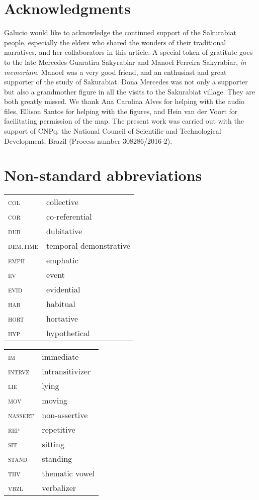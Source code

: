 \documentclass[output=paper,
modfonts,nonflat
]{langsci/langscibook}
\begin{document}
\newpage 
\section*{Acknowledgments}
Galucio would like to acknowledge the continued support of the Sakurabiat people, especially the elders who shared the wonders of their traditional narratives, and her collaborators in this article. A special token of gratitute goes to the late Mercedes Guaratira Sakyrabiar and Manoel Ferreira Sakyrabiar, \textit{in memoriam}. Manoel was a very good friend, and an enthusiast and great supporter of the study of Sakurabiat. Dona Mercedes was not only a supporter but also a grandmother figure in all the visits to the Sakurabiat village. They are both greatly missed. We thank Ana Carolina Alves for helping with the audio files, Ellison Santos for helping with the figures, and Hein van der Voort for facilitating permission of the map.
The present work was carried out with the support of CNPq, the National Council of Scientific and Technological Development, Brazil (Process number 308286/2016-2).

\section*{Non-standard abbreviations}

\begin{tabularx}{.5\textwidth}{lQ}
\textsc{col } & collective \\
\textsc{cor } & co-referential \\
\textsc{dub } & dubitative \\
\textsc{dem.time } & temporal demonstrative \\
\textsc{emph } & emphatic \\
\textsc{ev } & event \\
\textsc{evid } & evidential \\
\textsc{hab } & habitual \\
\textsc{hort } & hortative \\
\textsc{hyp } & hypothetical \\
\end{tabularx}
\begin{tabularx}{.45\textwidth}{lQ}
\textsc{im } & immediate \\
\textsc{intrvz } & intransitivizer \\
\textsc{lie } & lying \\
\textsc{mov } & moving \\
\textsc{nassert } & non-assertive \\
\textsc{rep } & repetitive \\
\textsc{sit } & sitting \\
\textsc{stand } & standing \\
\textsc{thv } & thematic vowel \\
\textsc{vbzl } & verbalizer \\
\end{tabularx}

{\sloppy
\printbibliography[heading=subbibliography,notkeyword=this]
}
\end{document}
